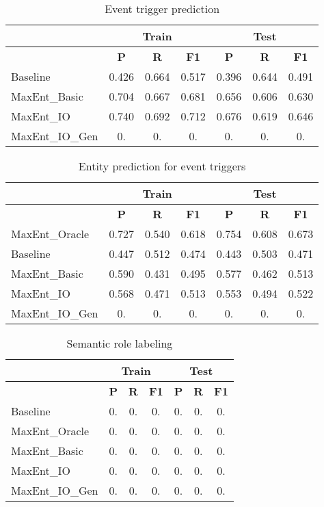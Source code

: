 \begin{table*}[ht]
\centering
\begin{tabular}{|l||c|c|c||c|c|c||} \hline
& \multicolumn{3}{|c||}{\textbf{Train}} & \multicolumn{3}{|c||}{\textbf{Test}}\\ \hline
&\textbf{P} & \textbf{R} & \textbf{F1} &\textbf{P} & \textbf{R} & \textbf{F1}\\ \hline
Baseline&0.426 & 0.664 &0.517&0.396 & 0.644 &0.491\\
MaxEnt\_Basic& 0.704 & 0.667&  0.681&0.656 & 0.606 &0.630 \\
MaxEnt\_IO&0.740&0.692&0.712&0.676 & 0.619 &0.646\\
MaxEnt\_IO\_Gen&0. & 0. &0.&0. & 0. &0.\\
\hline
\end{tabular}
\caption{Event trigger prediction}
\label{table:eventprediction}
\end{table*}

\begin{table*}[ht]
\centering
\begin{tabular}{|l||c|c|c||c|c|c||} \hline
& \multicolumn{3}{|c||}{\textbf{Train}} & \multicolumn{3}{|c||}{\textbf{Test}}\\ \hline
&\textbf{P} & \textbf{R} & \textbf{F1} &\textbf{P} & \textbf{R} & \textbf{F1}\\ \hline
MaxEnt\_Oracle&  0.727 & 0.540 &0.618&0.754 & 0.608 &0.673\\
Baseline&0.447 & 0.512 &0.474& 0.443 & 0.503 &0.471\\
MaxEnt\_Basic& 0.590 & 0.431 &0.495&0.577 & 0.462 &0.513\\
MaxEnt\_IO& 0.568 & 0.471 &0.513&0.553 & 0.494 &0.522\\
MaxEnt\_IO\_Gen& 0. & 0. &0.&0. & 0. &0.\\
\hline
\end{tabular}
\caption{Entity prediction for event triggers}
\label{table:entityprediction}
\end{table*}

\begin{table*}[ht]
\centering
\begin{tabular}{|l||c|c|c||c|c|c||} \hline
& \multicolumn{3}{|c||}{\textbf{Train}} & \multicolumn{3}{|c||}{\textbf{Test}}\\ \hline
&\textbf{P} & \textbf{R} & \textbf{F1} &\textbf{P} & \textbf{R} & \textbf{F1}\\ \hline
Baseline& 0. & 0. &0.&0. & 0. &0.\\
MaxEnt\_Oracle& 0. & 0. &0.&0. & 0. &0.\\
MaxEnt\_Basic& 0. & 0. &0.&0. & 0. &0.\\
MaxEnt\_IO& 0. & 0. &0.&0. & 0. &0.\\
MaxEnt\_IO\_Gen& 0. & 0. &0.&0. & 0. &0.\\
\hline
\end{tabular}
\caption{Semantic role labeling}
\label{table:srlprediction}
\end{table*}

